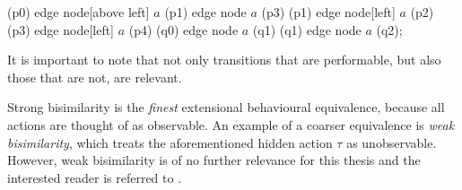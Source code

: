 \begin{isabellebody}
\begin{isamarkuptext}
{{    \path   (p0) edge node[above left]  {$a$}   (p1)
                 edge node              {$a$}   (p3)
            (p1) edge node[left]        {$a$}   (p2)
            (p3) edge node[left]        {$a$}   (p4)
            (q0) edge node              {$a$}   (q1)
            (q1) edge node              {$a$}   (q2);
}}

\pagebreak
It is important to note that not only transitions that are performable, but also those that are not, are relevant.


Strong bisimilarity is the \emph{finest} extensional behavioural equivalence, because all actions are thought of as observable. An example of a coarser equivalence is \emph{weak bisimilarity}, which treats the aforementioned hidden action $\tau$ as unobservable. However, weak bisimilarity is of no further relevance for this thesis and the interested reader is referred to \cite[Chapter 3.4]{reactivesystems}.


\end{isamarkuptext}
\end{isabellebody}
